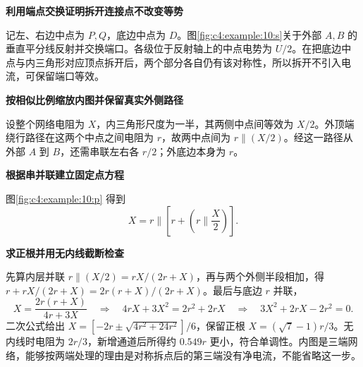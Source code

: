 \begin{solution}\textbf{利用端点交换证明拆开连接点不改变等势}\par\nobreak
记左、右边中点为 $P,Q$，底边中点为 $D$。图\ref{fig:c4:example:10:s}关于外部 $A,B$ 的垂直平分线反射并交换端口。各级位于反射轴上的中点电势为 $U/2$。在把底边中点与内三角形对应顶点拆开后，两个部分各自仍有该对称性，所以拆开不引入电流，可保留端口等效。



\par\medskip{}\noindent\textbf{按相似比例缩放内图并保留真实外侧路径}\par\nobreak
设整个网络电阻为 $X$，内三角形尺度为一半，其两侧中点间等效为 $X/2$。外顶端绕行路径在这两个中点之间电阻为 $r$，故两中点间为 $r\parallel(X/2)$。经这一路径从外部 $A$ 到 $B$，还需串联左右各 $r/2$；外底边本身为 $r$。



\par\medskip{}\noindent\textbf{根据串并联建立固定点方程}\par\nobreak
图\ref{fig:c4:example:10:p} 得到
\[
 X=r\parallel\left[r+\left(r\parallel\frac X2\right)\right].
\]


\par\medskip{}\noindent\textbf{求正根并用无内线截断检查}\par\nobreak
先算内层并联 $r\parallel(X/2)=rX/(2r+X)$，再与两个外侧半段相加，得 $r+rX/(2r+X)=2r(r+X)/(2r+X)$。最后与底边 $r$ 并联，
\[
 X=\frac{2r(r+X)}{4r+3X}
 \quad\Longrightarrow\quad4rX+3X^2=2r^2+2rX
 \quad\Longrightarrow\quad3X^2+2rX-2r^2=0.
\]
二次公式给出 $X=[-2r\pm\sqrt{4r^2+24r^2}]/6$，保留正根 $X=(\sqrt7-1)r/3$。无内线时电阻为 $2r/3$，新增通道后所得约 $0.549r$ 更小，符合单调性。内图是三端网络，能够按两端处理的理由是对称拆点后的第三端没有净电流，不能省略这一步。\end{solution}
